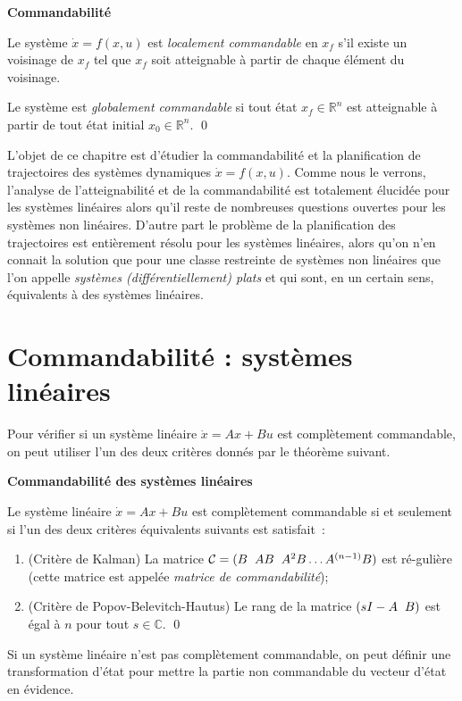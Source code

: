 \begin{definition}{{\bf Commandabilité}}

Le système $\dot x = f(x,u)$ est {\it localement commandable} en $x_f$ s'il
existe un voisinage de $x_f$ tel que $x_f$ soit atteignable à
partir de chaque élément du voisinage.

Le système est {\it globalement 
commandable} si tout état $x_f \in \mathbb{R}^n$ est atteignable à
partir de tout état initial $x_0 \in \mathbb{R}^n$.
\qed
\end{definition}
L'objet de ce chapitre est d'étudier la commandabilité et la planification de trajectoires des systèmes dynamiques $\dot x = f(x,u)$. Comme nous le verrons, l'analyse de
l'atteignabilité et de la commandabilité est totalement élucidée
pour les systèmes linéaires alors qu'il reste de nombreuses
questions ouvertes pour les systèmes non linéaires. D'autre
part le problème de la planification des trajectoires est
entièrement résolu pour les systèmes linéaires, alors qu'on n'en
connait la solution que pour une classe restreinte de systèmes
non linéaires que l'on appelle {\it systèmes (différentiellement)
plats} et qui sont, en un certain sens, équivalents à des
systèmes linéaires.


\section{Commandabilité : systèmes linéaires}

Pour vérifier si un système linéaire $\dot x = Ax + Bu$ est
complètement commandable, on peut utiliser l'un des deux critères
donnés par le théorème suivant.
\begin{theoreme} {\bf Commandabilité des systèmes linéaires}
\label{linear}


Le système linéaire $\dot x = Ax + Bu$ est complètement commandable
si et seulement si l'un des deux critères équivalents suivants est
satisfait~:
\begin{enumerate}
\item (Critère de Kalman) La matrice ${\cal C} = (B \hspace{2mm} AB \hspace{2mm} A^2B
\dots A^{(n-1)}B)$ est ré-gulière (cette matrice est appelée {\it
matrice de commandabilité}); 
\item (Critère de Popov-Belevitch-Hautus) Le rang de la matrice $(sI-A \hspace{2mm} B)$
est égal à $n$ pour tout $s \in {\mathbb {C}}$. \qed
\end{enumerate}
\end{theoreme}
Si un système linéaire n'est pas complètement commandable, on peut
définir une transformation d'état pour mettre la partie non
commandable du vecteur d'état en évidence.

